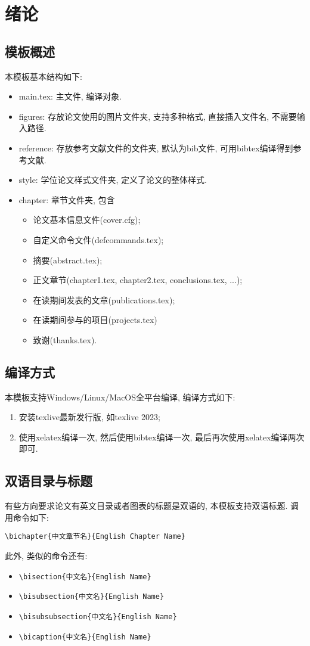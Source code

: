 \chapter{绪论} 
\label{chapter:Introduction}

\section{模板概述}
本模板基本结构如下:

\begin{itemize}
\item main.tex: 主文件, 编译对象.
\item figures: 存放论文使用的图片文件夹, 支持多种格式, 直接插入文件名, 不需要输入路径.
\item reference: 存放参考文献文件的文件夹, 默认为bib文件, 可用bibtex编译得到参考文献.
\item style: 学位论文样式文件夹, 定义了论文的整体样式.
\item chapter: 章节文件夹, 包含
\begin{itemize}
\item 论文基本信息文件(cover.cfg);
\item 自定义命令文件(defcommands.tex);
\item 摘要(abstract.tex);
\item 正文章节(chapter1.tex, chapter2.tex, conclusions.tex, ...);
\item 在读期间发表的文章(publications.tex);
\item 在读期间参与的项目(projects.tex)
\item 致谢(thanks.tex).
\end{itemize}
\end{itemize}

\section{编译方式}
本模板支持Windows/Linux/MacOS全平台编译, 编译方式如下:
\begin{enumerate}
\item 安装texlive最新发行版, 如texlive 2023;
\item 使用xelatex编译一次, 然后使用bibtex编译一次, 最后再次使用xelatex编译两次即可.
\end{enumerate}

\section{双语目录与标题}
有些方向要求论文有英文目录或者图表的标题是双语的, 本模板支持双语标题. 调用命令如下:
\begin{verbatim}
\bichapter{中文章节名}{English Chapter Name}
\end{verbatim}
此外, 类似的命令还有: 
\begin{itemize}
\item \verb|\bisection{中文名}{English Name}|
\item \verb|\bisubsection{中文名}{English Name}|
\item \verb|\bisubsubsection{中文名}{English Name}|
\item \verb|\bicaption{中文名}{English Name}|
\end{itemize}

